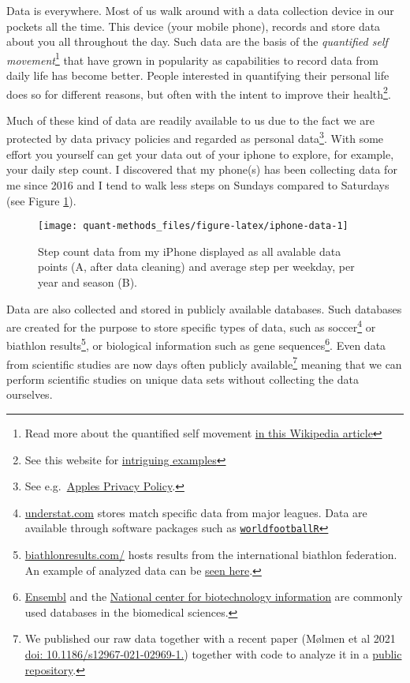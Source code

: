 \documentclass[
  11pt,
]{krantz}
\begin{document}
Data is everywhere. Most of us walk around with a data collection device in our pockets all the time. This device (your mobile phone), records and store data about you all throughout the day. Such data are the basis of the \emph{quantified self movement}\footnote{Read more about the quantified self movement \href{https://en.wikipedia.org/wiki/Quantified_self}{in this Wikipedia article}} that have grown in popularity as capabilities to record data from daily life has become better. People interested in quantifying their personal life does so for different reasons, but often with the intent to improve their health\footnote{See this website for \href{https://quantifiedself.com/show-and-tell/}{intriguing examples}}.

Much of these kind of data are readily available to us due to the fact we are protected by data privacy policies and regarded as personal data\footnote{See e.g.~\href{https://www.apple.com/legal/privacy/en-ww/}{Apples Privacy Policy}.}. With some effort you yourself can get your data out of your iphone to explore, for example, your daily step count. I discovered that my phone(s) has been collecting data for me since 2016 and I tend to walk less steps on Sundays compared to Saturdays (see Figure \ref{fig:iphone-data}).

\begin{figure}

{\centering \texttt{[image: quant-methods\_files/figure-latex/iphone-data-1]} 

}

\caption{Step count data from my iPhone displayed as all avalable data points (A, after data cleaning) and average step per weekday, per year and season (B).}\label{fig:iphone-data}
\end{figure}

Data are also collected and stored in publicly available databases. Such databases are created for the purpose to store specific types of data, such as soccer\footnote{\href{https://understat.com/}{understat.com} stores match specific data from major leagues. Data are available through software packages such as \href{https://jaseziv.github.io/worldfootballR/index.html}{\texttt{worldfootballR}}} or biathlon results\footnote{\href{https://biathlonresults.com/}{biathlonresults.com/} hosts results from the international biathlon federation. An example of analyzed data can be \href{https://sciathlon.github.io/post/biathlon_data_analysis/}{seen here}.}, or biological information such as gene sequences\footnote{\href{https://www.ensembl.org/}{Ensembl} and the \href{https://www.ncbi.nlm.nih.gov/}{National center for biotechnology information} are commonly used databases in the biomedical sciences.}. Even data from scientific studies are now days often publicly available\footnote{We published our raw data together with a recent paper (Mølmen et al 2021 \href{https://translational-medicine.biomedcentral.com/articles/10.1186/s12967-021-02969-1}{doi: 10.1186/s12967-021-02969-1.}) together with code to analyze it in a \href{https://github.com/dhammarstrom/rnaseq-copd}{public repository}.} meaning that we can perform scientific studies on unique data sets without collecting the data ourselves.
\end{document}
